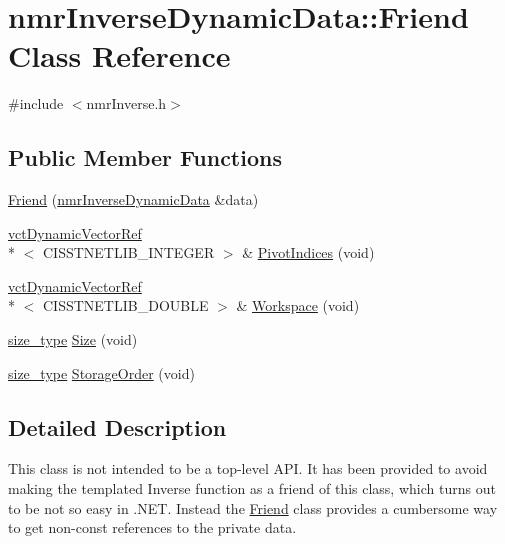 \hypertarget{classnmr_inverse_dynamic_data_1_1_friend}{\section{nmr\-Inverse\-Dynamic\-Data\-:\-:Friend Class Reference}
\label{classnmr_inverse_dynamic_data_1_1_friend}
}


{\ttfamily \#include $<$nmr\-Inverse.\-h$>$}

\subsection*{Public Member Functions}
\begin{DoxyCompactItemize}
\item 
\hyperlink{classnmr_inverse_dynamic_data_1_1_friend_a6e70a4de7c804e9e22c54a46c8ee93d4}{Friend} (\hyperlink{classnmr_inverse_dynamic_data}{nmr\-Inverse\-Dynamic\-Data} \&data)
\item 
\hyperlink{classvct_dynamic_vector_ref}{vct\-Dynamic\-Vector\-Ref}\\*
$<$ C\-I\-S\-S\-T\-N\-E\-T\-L\-I\-B\-\_\-\-I\-N\-T\-E\-G\-E\-R $>$ \& \hyperlink{classnmr_inverse_dynamic_data_1_1_friend_ad708058883a5ab865da310e1e5ae6b94}{Pivot\-Indices} (void)
\item 
\hyperlink{classvct_dynamic_vector_ref}{vct\-Dynamic\-Vector\-Ref}\\*
$<$ C\-I\-S\-S\-T\-N\-E\-T\-L\-I\-B\-\_\-\-D\-O\-U\-B\-L\-E $>$ \& \hyperlink{classnmr_inverse_dynamic_data_1_1_friend_ae343911867b411f141de3648bac1ebcb}{Workspace} (void)
\item 
\hyperlink{classnmr_inverse_dynamic_data_aeb5c2317adf50d8fc7952a9b38bf0129}{size\-\_\-type} \hyperlink{classnmr_inverse_dynamic_data_1_1_friend_ac6c64427fe6f2cf5a335690f318e8550}{Size} (void)
\item 
\hyperlink{classnmr_inverse_dynamic_data_aeb5c2317adf50d8fc7952a9b38bf0129}{size\-\_\-type} \hyperlink{classnmr_inverse_dynamic_data_1_1_friend_aa67627baa779a23dd5190be9cabb3308}{Storage\-Order} (void)
\end{DoxyCompactItemize}


\subsection{Detailed Description}
This class is not intended to be a top-\/level A\-P\-I. It has been provided to avoid making the templated Inverse function as a friend of this class, which turns out to be not so easy in .N\-E\-T. Instead the \hyperlink{classnmr_inverse_dynamic_data_1_1_friend}{Friend} class provides a cumbersome way to get non-\/const references to the private data. 


